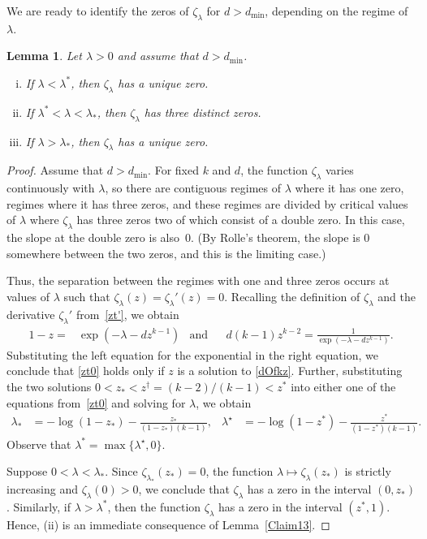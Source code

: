 \documentclass[10pt,reqno]{amsart}
\numberwithin{equation}{section}
\renewcommand{\ln}{\log}
\newcommand\dmin{d_{\mathrm{min}}}
\newcommand\Lem{Lemma}
\newtheorem{lemma}[definition]{Lemma}
\newcommand{\la}{\lambda}
\newcommand{\zt}{\zeta_\lambda}
\newcommand{\expld}{\exp(-\lambda-d z^{k-1})}
\begin{document}
We are ready to identify the zeros of $\zt$ for $d>\dmin$, depending on the regime of $\lambda$.

\begin{lemma}\label{lem_zero}
	Let $\lambda>0$ and assume that $d>\dmin$.
	\begin{enumerate}[(i)]
		\item If  $\lambda<\lambda^*$, then $\zt$ has a unique zero.
		\item If  $\lambda^*<\lambda<\lambda_*$, then $\zt$ has three distinct zeros.
		\item If  $\lambda>\lambda_*$, then $\zt$ has a unique zero.
	\end{enumerate}
\end{lemma}
\begin{proof}
	Assume that $d>\dmin$.
	For fixed $k$ and $d$, the function $\zeta_\lambda$ varies continuously with $\la$, so there are contiguous regimes of $\la$ where it has one zero, regimes where it has three zeros, and these regimes are divided by critical values of $\la$ where $\zt$ has three zeros two of which consist of a double zero.
	In this case, the slope at the double zero is also~0.
	(By Rolle's theorem, the slope is 0 somewhere between the two zeros, and this is the limiting case.)

	Thus, the separation between the regimes with one and three zeros occurs at values of $\lambda$ such that $\zt(z)=\zt'(z)=0$.
	Recalling the definition of $\zt$ and the derivative $\zt'$ from~\eqref{zt'}, we obtain
	\begin{align} \label{zt0}
		1-z=&\expld&\mbox{and}&& d(k-1)z^{k-2}=\frac{1}{\expld} .
	\end{align}
	Substituting the left equation for the exponential in the right equation, we conclude that \eqref{zt0} holds only if $z$ is a solution to \eqref{dOfkz}.
	Further, substituting the two solutions $0<z_*<z^\dagger=(k-2)/(k-1)<z^*$ into either one of the equations from~\eqref{zt0} and solving for $\lambda$, we obtain
	\begin{align*}
		\lambda_*&=-\ln(1-z_*) -\frac{z_*}{(1-z_*)(k-1)},&
		\lambda^\star&=- \ln(1-z^*) -\frac{z^*}{(1-z^*)(k-1)}.
	\end{align*}
	Observe that $\lambda^*=\max\{\lambda^\star,0\}$.

	Suppose $0<\lambda<\lambda_*$.
	Since $\zeta_{\lambda_*}(z_*)=0$, the function $\lambda\mapsto\zeta_\lambda(z_*)$ is strictly increasing and $\zeta_\lambda(0)>0$, we conclude that $\zeta_\lambda$ has a zero in the interval $(0,z_*)$.
	Similarly, if $\lambda>\lambda^*$, then the function $\zeta_\lambda$ has a zero in the interval $(z^*,1)$.
	Hence, (ii) is an immediate consequence of \Lem~\ref{Claim13}.


\end{proof}
\end{document}
